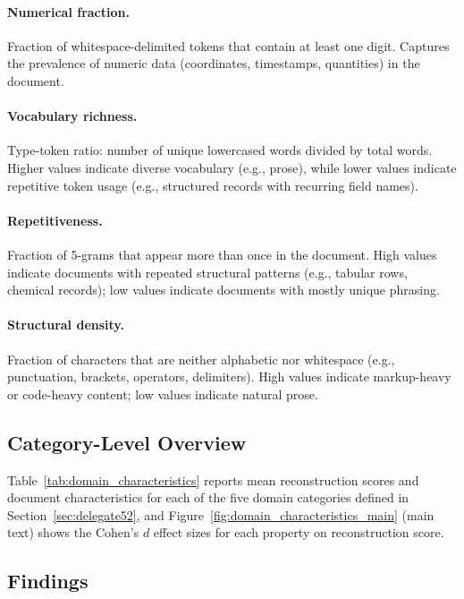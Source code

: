 \documentclass{article} %
\begin{document}
\paragraph{Numerical fraction.} Fraction of whitespace-delimited tokens that contain at least one digit. Captures the prevalence of numeric data (coordinates, timestamps, quantities) in the document.

\paragraph{Vocabulary richness.} Type-token ratio: number of unique lowercased words divided by total words. Higher values indicate diverse vocabulary (e.g., prose), while lower values indicate repetitive token usage (e.g., structured records with recurring field names).

\paragraph{Repetitiveness.} Fraction of 5-grams that appear more than once in the document. High values indicate documents with repeated structural patterns (e.g., tabular rows, chemical records); low values indicate documents with mostly unique phrasing.

\paragraph{Structural density.} Fraction of characters that are neither alphabetic nor whitespace (e.g., punctuation, brackets, operators, delimiters). High values indicate markup-heavy or code-heavy content; low values indicate natural prose.

\subsection{Category-Level Overview}

Table~\ref{tab:domain_characteristics} reports mean reconstruction scores and document characteristics for each of the five domain categories defined in Section~\ref{sec:delegate52}, and Figure~\ref{fig:domain_characteristics_main} (main text) shows the Cohen's $d$ effect sizes for each property on reconstruction score.

\subsection{Findings}
\end{document}
